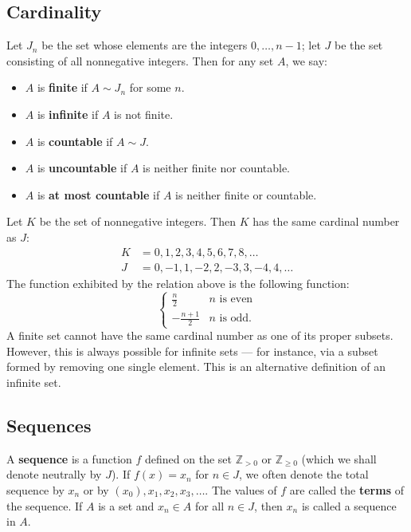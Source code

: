 \documentclass[11pt]{article}
\begin{document}

\subsection{Cardinality}

Let $J_{n}$ be the set whose elements are the integers $0, \ldots, n - 1$; let $J$ be the set consisting of all nonnegative integers. Then for any set $A$, we say:
\begin{itemize}
	\item $A$ is \textbf{finite} if $A \sim J_{n}$ for some $n$.
	\item $A$ is \textbf{infinite} if $A$ is not finite.
	\item $A$ is \textbf{countable} if $A \sim J$.
	\item $A$ is \textbf{uncountable} if $A$ is neither finite nor countable.
	\item $A$ is \textbf{at most countable} if $A$ is neither finite or countable.
\end{itemize}
Let $K$ be the set of nonnegative integers. Then $K$ has the same cardinal number as $J$:
\begin{align*}
	K &= 0, 1, 2, 3, 4, 5, 6, 7, 8, \ldots \\
	J &= 0, -1, 1, -2, 2, -3, 3, -4, 4, \ldots
\end{align*}
The function exhibited by the relation above is the following function:
\[
	\begin{cases}
		\tfrac{n}{2} & n \text{ is even} \\
		-\tfrac{n + 1}{2} & n \text{ is odd}.
	\end{cases}
\]
A finite set cannot have the same cardinal number as one of its proper subsets. However, this is always possible for infinite sets --- for instance, via a subset formed by removing one single element. This is an alternative definition of an infinite set.


\subsection{Sequences} 

A \textbf{sequence} is a function $f$ defined on the set $\mathbb{Z}_{> 0}$ or $\mathbb{Z}_{\ge 0}$ (which we shall denote neutrally by $J$). If $f(x) = x_{n}$ for $n \in J$, we often denote the total sequence by ${x_{n}}$ or by $(x_{0}), x_{1}, x_{2}, x_{3}, \ldots$. The values of $f$ are called the \textbf{terms} of the sequence. If $A$ is a set and $x_{n} \in A$ for all $n \in J$, then ${x_{n}}$ is called a sequence in $A$.
\end{document}
